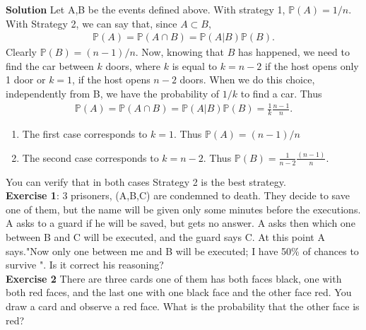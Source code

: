 \documentclass[reqno]{amsart}
\newcommand{\<}{{\langle \!\! \langle}}
\renewcommand{\>}{{\rangle \!\! \rangle}}
\newcommand{\bel}[2]{\begin{equation} \label{#1} \begin{split} #2
 					\end{split} \end{equation}}
\begin{document}
\textbf{Solution} Let A,B be the events defined above. 
With strategy 1, $\mathbb{P}(A)=1/n$. With Strategy 2, we can say that, since $A\subset B$,  
\bel{}{\mathbb{P}(A)=\mathbb{P}(A\cap B)=\mathbb{P}(A|B)\mathbb{P}(B).}
Clearly $\mathbb{P}(B)=(n-1)/n$. Now, knowing that $B$ has happened, we need to find the car between $k$ doors, where $k$ is equal to $k=n-2$ if the host opens only 1 door or $k=1$, if the host opens $n-2$ doors. When we do this choice, independently from B, we have the probability of $1/k$ to find a car. Thus 
\bel{}{\mathbb{P}(A)=\mathbb{P}(A\cap B)=\mathbb{P}(A|B)\mathbb{P}(B)=\frac{1}{k}\frac{n-1}{n}.}
\begin{enumerate}
    \item The first case corresponds to $k=1$. Thus $\mathbb{P}(A)=(n-1)/n$\\
    \item The second case corresponds to $k=n-2$. Thus  $\mathbb{P}(B)=\frac{1}{n-2}\frac{(n-1)}{n}$.
\end{enumerate}
You can verify that in both cases Strategy 2 is the best strategy. \\


\textbf{Exercise 1}: 3 prisoners, (A,B,C) are condemned to death. They decide to save one of them, but the name will be given only some minutes before the executions. A asks to a guard if he will be saved, but gets no answer. A asks then which one between B and C will be executed, and the guard says C. At this point A says."Now only one between me and B will be executed; I have 50\% of chances to survive ". Is it correct his reasoning?\\

\textbf{Exercise 2} There are three cards one of them has both faces black, one with both red faces, and the last one with one black face and the other face red. You draw a card and observe a red face. What is the probability that the other face is red? 
\end{document}
